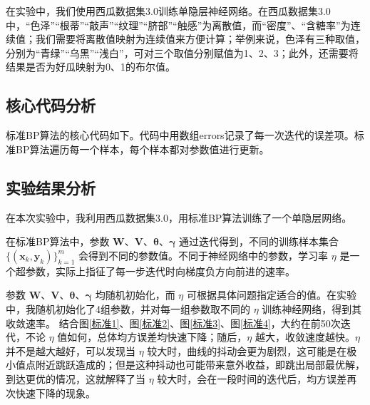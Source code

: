 \documentclass{ctexart}
\begin{document}
	在实验中，我们使用西瓜数据集3.0训练单隐层神经网络。在西瓜数据集3.0中，“色泽”“根蒂”“敲声”“纹理”“脐部”“触感”为离散值，而“密度”、“含糖率”为连续值；我们需要将离散值映射为连续值来方便计算；举例来说，色泽有三种取值，分别为“青绿”“乌黑”“浅白”，可对三个取值分别赋值为1、2、3；此外，还需要将结果是否为好瓜映射为0、1的布尔值。

	\subsection{核心代码分析}
	
	标准BP算法的核心代码如下。代码中用数组errors记录了每一次迭代的误差项。标准BP算法遍历每一个样本，每个样本都对参数值进行更新。\\
	
	
	
	\subsection{实验结果分析}
	
	在本次实验中，我利用西瓜数据集3.0，用标准BP算法训练了一个单隐层网络。
	
	在标准BP算法中，参数 $\bm{W}$、$\bm{V}$、$\bm{\theta}$、$\bm{\gamma}$ 通过迭代得到，不同的训练样本集合 $\{(\bm{x}_k,\bm{y}_k)\}_{k=1}^m$ 会得到不同的参数值。不同于神经网络中的参数，学习率 $\eta$ 是一个超参数，实际上指征了每一步迭代时向梯度负方向前进的速率。
	
	参数 $\bm{W}$、$\bm{V}$、$\bm{\theta}$、$\bm{\gamma}$ 均随机初始化，而 $\eta$ 可根据具体问题指定适合的值。在实验中，我随机初始化了4组参数，并对每一组参数取不同的 $\eta$ 训练神经网络，得到其收敛速率。
	结合图\ref{标准1}、图\ref{标准2}、图\ref{标准3}、图\ref{标准4}，大约在前50次迭代，不论 $\eta$ 值如何，总体均方误差均快速下降；随后，$\eta$ 越大，收敛速度越快。$\eta$ 并不是越大越好，可以发现当 $\eta$ 较大时，曲线的抖动会更为剧烈，这可能是在极小值点附近跳跃造成的；但是这种抖动也可能带来意外收益，即跳出局部最优解，到达更优的情况，这就解释了当 $\eta$ 较大时，会在一段时间的迭代后，均方误差再次快速下降的现象。
	
\end{document}
